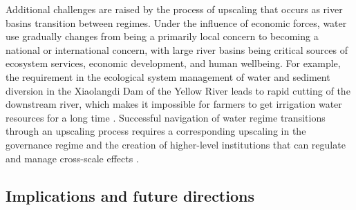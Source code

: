 Additional challenges are raised by the process of upscaling that occurs as river basins transition between regimes. Under the influence of economic forces, water use gradually changes from being a primarily local concern to becoming a national or international concern, with large river basins being critical sources of ecosystem services, economic development, and human wellbeing. 
For example, the requirement in the ecological system management of water and sediment diversion in the Xiaolangdi Dam of the Yellow River leads to rapid cutting of the downstream river, which makes it impossible for farmers to get irrigation water resources for a long time 
\cite{kongEnvironmentalimpactassessments2017}.
Successful navigation of water regime transitions through an upscaling process requires a corresponding upscaling in the governance regime and the creation of higher-level institutions that can regulate and manage cross-scale effects 
\cite{cummingScalemismatchessocialecological2006}. 

\subsection{Implications and future directions}
\label{Outlook}

